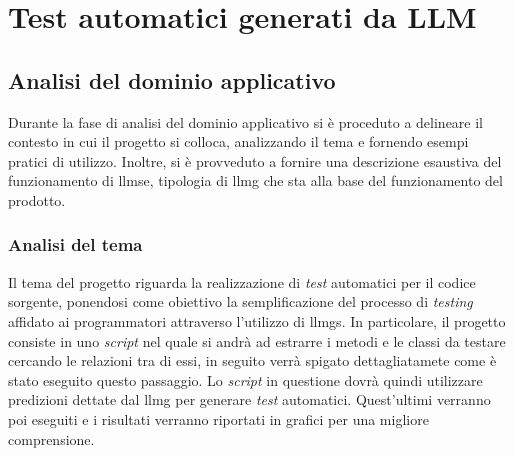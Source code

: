 \chapter{Test automatici generati da LLM}
\label{chap:descrizione-stage-1}
\section{Analisi del dominio applicativo}
Durante la fase di analisi del dominio applicativo si è proceduto a delineare il contesto in cui il progetto si colloca, analizzando il tema e fornendo esempi pratici di utilizzo. Inoltre, si è provveduto a fornire una descrizione esaustiva del funzionamento di \gls{llmse}\glox, tipologia di \gls{llmg} che sta alla base del funzionamento del prodotto.
    \subsection{Analisi del tema}
    Il tema del progetto riguarda la realizzazione di \textit{test} automatici per il codice sorgente, ponendosi come obiettivo la semplificazione del processo di \textit{testing} affidato ai programmatori attraverso l'utilizzo di \glspl{llmg}.
    In particolare, il progetto consiste in uno \textit{script} nel quale si andrà ad estrarre i metodi e le classi da testare cercando le relazioni tra di essi, in seguito verrà spigato dettagliatamete come è stato eseguito questo passaggio.
    Lo \textit{script} in questione dovrà quindi utilizzare predizioni dettate dal \gls{llmg} per generare \textit{test} automatici. Quest'ultimi verranno poi eseguiti e i risultati verranno riportati in grafici per una migliore comprensione.  



